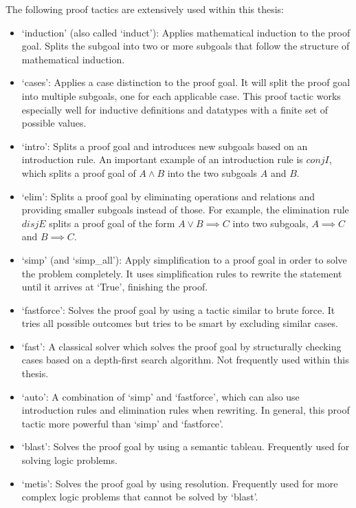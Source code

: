 The following proof tactics are extensively used within this thesis:
\begin{itemize}
    \item `induction' (also called `induct'): Applies mathematical induction to the proof goal. Splits the subgoal into two or more subgoals that follow the structure of mathematical induction.
    \item `cases': Applies a case distinction to the proof goal. It will split the proof goal into multiple subgoals, one for each applicable case. This proof tactic works especially well for inductive definitions and datatypes with a finite set of possible values.
    \item `intro': Splits a proof goal and introduces new subgoals based on an introduction rule. An important example of an introduction rule is $conjI$, which splits a proof goal of $A \land B$ into the two subgoals $A$ and $B$.
    \item `elim': Splits a proof goal by eliminating operations and relations and providing smaller subgoals instead of those. For example, the elimination rule $disjE$ splits a proof goal of the form $A \lor B \implies C$ into two subgoals, $A \implies C$ and $B \implies C$.
    \item `simp' (and `simp\_all'): Apply simplification to a proof goal in order to solve the problem completely. It uses simplification rules to rewrite the statement until it arrives at `True', finishing the proof.
    \item `fastforce': Solves the proof goal by using a tactic similar to brute force. It tries all possible outcomes but tries to be smart by excluding similar cases.
    \item `fast': A classical solver which solves the proof goal by structurally checking cases based on a depth-first search algorithm. Not frequently used within this thesis.
    \item `auto': A combination of `simp' and `fastforce', which can also use introduction rules and elimination rules when rewriting. In general, this proof tactic more powerful than `simp' and `fastforce'.
    \item `blast': Solves the proof goal by using a semantic tableau. Frequently used for solving logic problems.
    \item `metis': Solves the proof goal by using resolution. Frequently used for more complex logic problems that cannot be solved by `blast'.
\end{itemize}

